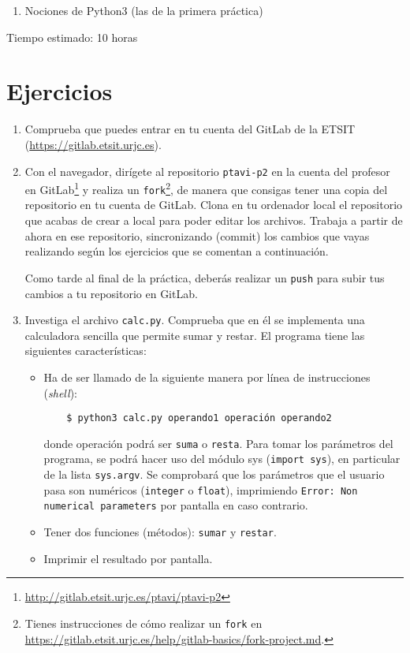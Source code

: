 \documentclass[11pt,a4paper]{article}
\begin{document}
\begin{enumerate}
  \item Nociones de Python3 (las de la primera práctica)
\end{enumerate}

Tiempo estimado: 10 horas

\section{Ejercicios}

\begin{enumerate}

  \item Comprueba que puedes entrar en tu cuenta del GitLab de la ETSIT (\url{https://gitlab.etsit.urjc.es}).

    \item Con el navegador, dirígete al repositorio \texttt{ptavi-p2} en la cuenta del profesor en GitLab\footnote{\url{http://gitlab.etsit.urjc.es/ptavi/ptavi-p2}} y realiza un \texttt{fork}\footnote{Tienes instrucciones de cómo realizar un \texttt{fork} en \url{https://gitlab.etsit.urjc.es/help/gitlab-basics/fork-project.md}.}, de manera que consigas tener una copia del repositorio en tu cuenta de GitLab. Clona en tu ordenador local el repositorio que acabas de crear a local para poder editar los archivos. Trabaja a partir de ahora en ese repositorio, sincronizando (commit) los cambios que vayas realizando según los ejercicios que se comentan a continuación.

  Como tarde al final de la práctica, deberás realizar un \texttt{push} para subir tus cambios a tu repositorio en GitLab.

  \item Investiga el archivo \texttt{calc.py}. Comprueba que en él se implementa una calculadora sencilla que permite sumar y restar. El programa tiene las siguientes características:
  \begin{itemize}
    \item Ha de ser llamado de la siguiente manera por línea de instrucciones (\emph{shell}):
    \begin{verbatim}
    $ python3 calc.py operando1 operación operando2
    \end{verbatim}
donde operación podrá ser \texttt{suma} o \texttt{resta}. Para tomar los parámetros del programa, se podrá hacer uso del módulo sys (\texttt{import sys}), en particular de la lista \texttt{sys.argv}. Se comprobará que los parámetros que el usuario pasa son numéricos (\texttt{integer} o \texttt{float}), imprimiendo \texttt{Error: Non numerical parameters} por pantalla en caso contrario.
    \item Tener dos funciones (métodos): \texttt{sumar} y \texttt{restar}.
    \item Imprimir el resultado por pantalla.
  \end{itemize}



\end{enumerate}
\end{document}
